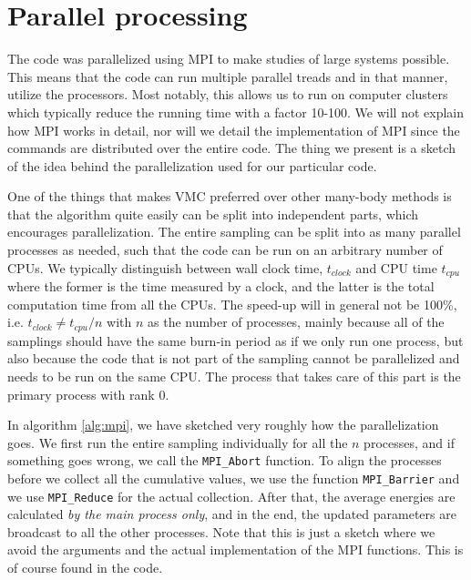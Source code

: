 \section{Parallel processing}
The code was parallelized using MPI to make studies of large systems possible. This means that the code can run multiple parallel treads and in that manner, utilize the processors. Most notably, this allows us to run on computer clusters which typically reduce the running time with a factor 10-100. We will not explain how MPI works in detail, nor will we detail the implementation of MPI since the commands are distributed over the entire code. The thing we present is a sketch of the idea behind the parallelization used for our particular code.

One of the things that makes VMC preferred over other many-body methods is that the algorithm quite easily can be split into independent parts, which encourages parallelization. The entire sampling can be split into as many parallel processes as needed, such that the code can be run on an arbitrary number of CPUs. We typically distinguish between wall clock time, $t_{clock}$ and CPU time $t_{cpu}$ where the former is the time measured by a clock, and the latter is the total computation time from all the CPUs. The speed-up will in general not be 100\%, i.e. $t_{clock}\neq t_{cpu}/n$ with $n$ as the number of processes, mainly because all of the samplings should have the same burn-in period as if we only run one process, but also because the code that is not part of the sampling cannot be parallelized and needs to be run on the same CPU. The process that takes care of this part is the primary process with rank 0.

In algorithm \ref{alg:mpi}, we have sketched very roughly how the parallelization goes. We first run the entire sampling individually for all the $n$ processes, and if something goes wrong, we call the \lstinline|MPI_Abort| function. To align the processes before we collect all the cumulative values, we use the function \lstinline|MPI_Barrier| and we use \lstinline|MPI_Reduce| for the actual collection. After that, the average energies are calculated \textit{by the main process only}, and in the end, the updated parameters are broadcast to all the other processes. Note that this is just a sketch where we avoid the arguments and the actual implementation of the MPI functions. This is of course found in the code.

